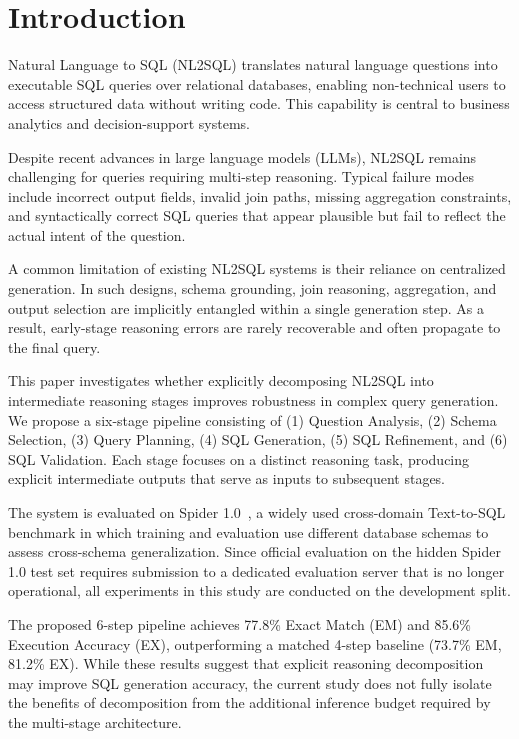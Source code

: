 \documentclass{svproc}
\begin{document}
\section{Introduction}
\label{sec:intro}

Natural Language to SQL (NL2SQL) translates natural language questions into executable SQL queries over relational databases, enabling non-technical users to access structured data without writing code. This capability is central to business analytics and decision-support systems.

Despite recent advances in large language models (LLMs), NL2SQL remains challenging for queries requiring multi-step reasoning. Typical failure modes include incorrect output fields, invalid join paths, missing aggregation constraints, and syntactically correct SQL queries that appear plausible but fail to reflect the actual intent of the question. 

A common limitation of existing NL2SQL systems is their reliance on centralized generation. In such designs, schema grounding, join reasoning, aggregation, and output selection are implicitly entangled within a single generation step. As a result, early-stage reasoning errors are rarely recoverable and often propagate to the final query.

This paper investigates whether explicitly decomposing NL2SQL into intermediate reasoning stages improves robustness in complex query generation. We propose a six-stage pipeline consisting of (1) Question Analysis, (2) Schema Selection, (3) Query Planning, (4) SQL Generation, (5) SQL Refinement, and  (6) SQL Validation. Each stage focuses on a distinct reasoning task, producing explicit intermediate outputs that serve as inputs to subsequent stages. 

The system is evaluated on Spider 1.0~\cite{yu2018spider}, a widely used cross-domain Text-to-SQL benchmark in which training and evaluation use different database schemas to assess cross-schema generalization. Since official evaluation on the hidden Spider 1.0 test set requires submission to a dedicated evaluation server that is no longer operational, all experiments in this study are conducted on the development split.

The proposed 6-step pipeline achieves 77.8\% Exact Match (EM) and 85.6\% Execution Accuracy (EX), outperforming a matched 4-step baseline (73.7\% EM, 81.2\% EX). While these results suggest that explicit reasoning decomposition may improve SQL generation accuracy, the current study does not fully isolate the benefits of decomposition from the additional inference budget required by the multi-stage architecture.
\end{document}
